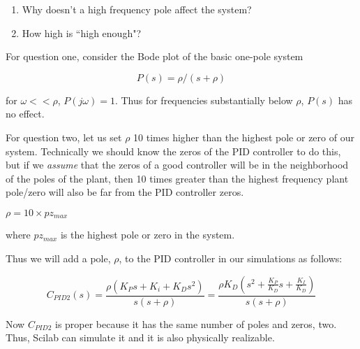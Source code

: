 

\begin{enumerate}
  \item Why doesn't a high frequency pole affect the system?
  \item How high is ``high enough"?
\end{enumerate}

 




For question one, consider the Bode plot of the basic one-pole system	%


\[
P(s) = \rho/(s+\rho)
\]

for $\omega << \rho$, $P(j\omega) = 1$.
Thus for frequencies substantially below $\rho$, $P(s)$ has no effect.	%






For question two, let us set $\rho$ 10 times higher than the highest pole or zero of our system.   Technically we should know the zeros of the PID controller to do this, but if we {\it assume} that the zeros of a good controller will be in the neighborhood of the poles of the plant, then 10 times greater than the highest frequency plant pole/zero will also be far from the PID controller zeros.	%

$\rho = 10\times pz_{max}$	%

where $pz_{max}$ is the highest pole or zero in the system.	%

Thus we will add a pole, $\rho$,  to the PID controller in our simulations as follows:	%
 
\[
C_{PID2}(s) = \frac{\rho(K_Ps+K_i + K_Ds^2)}{s(s+\rho)} = \frac{\rho K_D(s^2 + \frac{K_P}{K_D}s + \frac{K_I}{K_D})}{s(s+\rho)}
\]

Now $C_{PID2}$ is proper
because it has the same number of poles and zeros, two.  Thus, Scilab can simulate it and it is also physically realizable.	%








